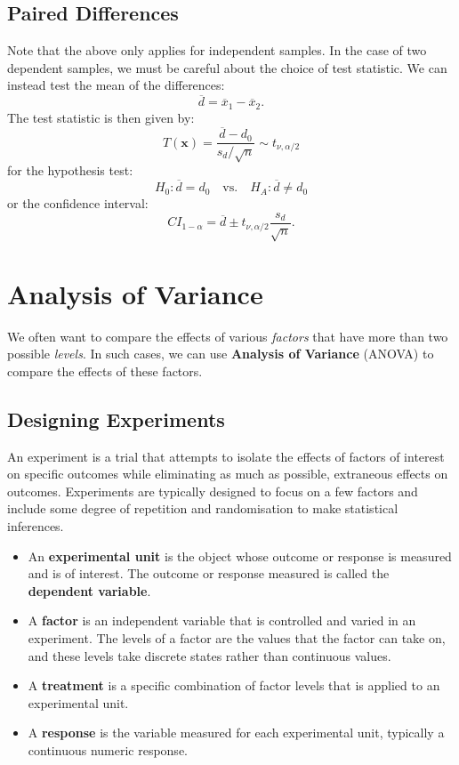 \documentclass{article}
\begin{document}
\subsection{Paired Differences}
Note that the above only applies for independent samples. In the case
of two dependent samples, we must be careful about the choice of test
statistic. We can instead test the mean of the differences:
\begin{equation*}
    \overline{d} = \overline{x}_1 - \overline{x}_2.
\end{equation*}
The test statistic is then given by:
\begin{equation*}
    T\left( \symbf{x} \right) = \frac{\overline{d} - d_0}{s_d / \sqrt{n}} \sim t_{\nu, \alpha/2}
\end{equation*}
for the hypothesis test:
\begin{equation*}
    H_0: \overline{d} = d_0 \quad \text{vs.} \quad H_A: \overline{d} \neq d_0
\end{equation*}
or the confidence interval:
\begin{equation*}
    CI_{1-\alpha} = \overline{d} \pm t_{\nu, \alpha/2} \frac{s_d}{\sqrt{n}}.
\end{equation*}
\section{Analysis of Variance}
We often want to compare the effects of various \textit{factors} that
have more than two possible \textit{levels}. In such cases, we can use
\textbf{Analysis of Variance} (ANOVA) to compare the effects of these
factors.
\subsection{Designing Experiments}
An experiment is a trial that attempts to isolate the effects of
factors of interest on specific outcomes while eliminating as much as
possible, extraneous effects on outcomes. Experiments are typically
designed to focus on a few factors and include some degree of
repetition and randomisation to make statistical inferences.
\begin{itemize}
    \item An \textbf{experimental unit} is the object whose outcome or
          response is measured and is of interest. The outcome or
          response measured is called the \textbf{dependent variable}.
    \item A \textbf{factor} is an independent variable that is
          controlled and varied in an experiment. The levels of a
          factor are the values that the factor can take on, and these
          levels take discrete states rather than continuous values.
    \item A \textbf{treatment} is a specific combination of factor
          levels that is applied to an experimental unit.
    \item A \textbf{response} is the variable measured for each
          experimental unit, typically a continuous numeric response.
\end{itemize}
\end{document}
